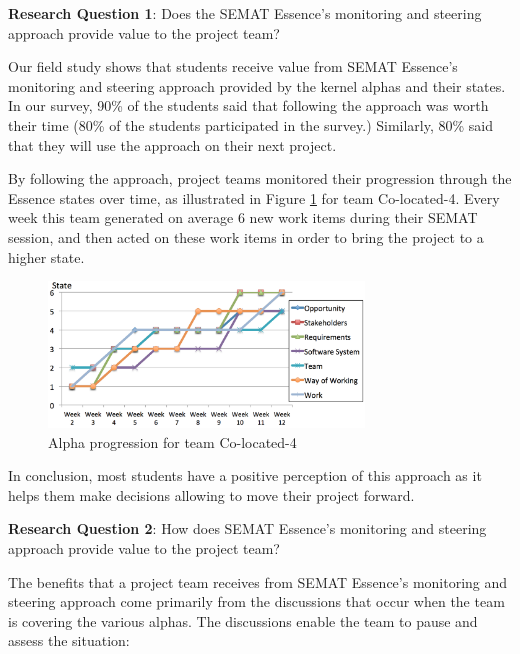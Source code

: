 \textbf{Research Question 1}: Does the SEMAT Essence's monitoring and steering approach provide value to the project team?

Our field study shows that students receive value from SEMAT Essence's monitoring and steering approach provided by the kernel alphas and their states. In our survey, 90\% of the students said that following the approach was worth their time (80\% of the students participated in the survey.) Similarly, 80\% said that they will use the approach on their next project.

By following the approach, project teams monitored their progression through the Essence states over time, as illustrated in Figure \ref{AlphaProgressionColocated4} for team Co-located-4. Every week this team generated on average 6 new work items during their SEMAT session, and then acted on these work items in order to bring the project to a higher state.

\begin{figure}[h]
\centering
\includegraphics[width=3.30in]{project_steering_images/AlphaProgressionColocated4.png}
\caption{Alpha progression for team Co-located-4}
\label{AlphaProgressionColocated4}
\end{figure}


In conclusion, most students have a positive perception of this approach as it helps them make decisions allowing to move their project forward.

\textbf{Research Question 2}: How does SEMAT Essence's monitoring and steering approach provide value to the project team?

The benefits that a project team receives from SEMAT Essence's monitoring and steering approach come primarily from the discussions that occur when the team is covering the various alphas. The discussions enable the team to pause and assess the situation:

